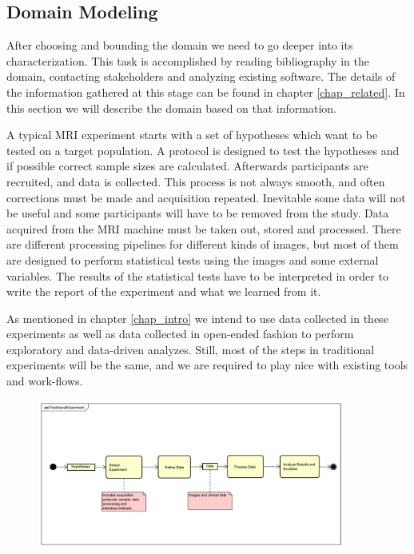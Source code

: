 \subsection{Domain Modeling}

After choosing and bounding the domain we need to go deeper into its characterization. This task is accomplished by reading bibliography in the domain, contacting stakeholders and analyzing existing software. The details of the information gathered at this stage can be found in chapter \ref{chap_related}. In this section we will describe the domain based on that information.

A typical MRI experiment starts with a set of hypotheses which want to be tested on a target population. A protocol is designed to test the hypotheses and if possible correct sample sizes are calculated. Afterwards participants are recruited, and data is collected. This process is not always smooth, and often corrections must be made and acquisition repeated. Inevitable some data will not be useful and some participants will have to be removed from the study. Data acquired from the MRI machine must be taken out, stored and processed. There are different processing pipelines for different kinds of images, but most of them are designed to perform statistical tests using the images and some external variables. The results of the statistical tests have to be interpreted in order to write the report of the experiment and what we learned from it.

As mentioned in chapter \ref{chap_intro} we intend to use data collected in these experiments as well as data collected in open-ended fashion to perform exploratory and data-driven analyzes. Still, most of the steps in traditional experiments will be the same, and we are required to play nice with existing tools and work-flows. 

\begin{figure}
\includegraphics[width=0.9\textwidth]{Figures/domain/TraditionalExperiment}	
\caption{\label{fig_workflows}}
\end{figure}

